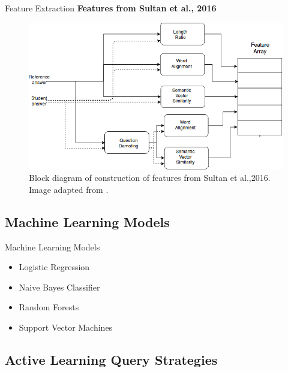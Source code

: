 \documentclass{beamer}
\begin{document}
\begin{frame}{Feature Extraction}
	\textbf{Features from Sultan et al., 2016}
	\begin{figure}[!htb]
		\centering
		\includegraphics[scale=0.40]{images/feature_array}
		\caption{ Block diagram of construction of features from Sultan et al.,2016. Image adapted from \cite{ramesh2} \cite{Sultan2016}.}
		\label{nngrades}
	\end{figure}
\end{frame}




\subsection{Machine Learning Models}

\begin{frame}{Machine Learning Models}
	\begin{itemize}
		\item Logistic Regression
		\item Naive Bayes Classifier
		\item Random Forests
		\item Support Vector Machines
	\end{itemize}
\end{frame}




\subsection{Active Learning Query Strategies}
\end{document}
